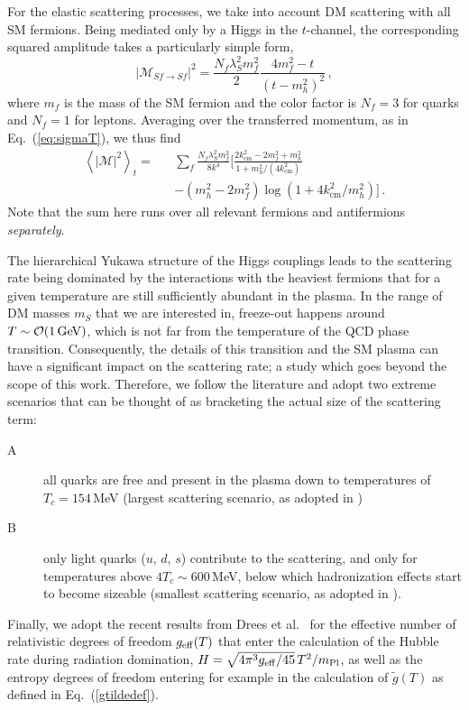 \documentclass[twocolumn,showpacs,amsmath,amssymb,superscriptaddress,nofootinbib]{revtex4-1}
\newcommand{\be}{\begin{equation}}
\newcommand{\ee}{\end{equation}}
\newcommand{\bea}{\begin{eqnarray}}
\newcommand{\eea}{\end{eqnarray}}
\begin{document}
For the elastic scattering processes, we take into account DM scattering with all SM fermions. Being mediated 
only by a Higgs in the $t$-channel, the corresponding squared amplitude takes a particularly simple form,
\be
\left| \mathcal{M}_{Sf\to Sf}\right|^2 = \frac{N_f\lambda_S^2m_f^2}{2}\frac{4m_f^2-t}{(t-m_h^2)^2} \,,
\ee
where $m_f$ is the mass of the SM fermion and the color factor is $N_f= 3$ for quarks and $N_f= 1$ 
for leptons.  Averaging over the transferred momentum, as in Eq.~(\ref{eq:sigmaT}), 
we thus find
\bea
\left\langle \left| \mathcal{M}\right|^2 \right\rangle_t=&&
\sum_f\frac{N_f\lambda_S^2m_f^2}{8k^4}\Big[
\frac{2k^2_\mathrm{cm}-2m_f^2+m_h^2}{1+m_h^2/(4k^2_\mathrm{cm})} \nonumber \\
&&-\left( m_h^2-2m_f^2\right) \log\left(1+4k^2_\mathrm{cm}/m_h^2 \right)
\Big]\,.
\label{eq:Mscatt}
\eea
Note that the sum here runs over all relevant fermions and antifermions {\it separately}.

The hierarchical Yukawa structure of the Higgs couplings leads to the scattering rate being 
dominated by the interactions with the heaviest fermions that for a given temperature are still 
sufficiently abundant in the plasma. In the range of DM masses $m_S$ that 
we are interested in, freeze-out happens around $T\sim \mathcal{O}(1\, \rm{GeV})$, which 
is not far from the temperature of the QCD phase transition. 
Consequently, the details of this transition and the SM plasma can have a significant impact 
on the scattering rate; a study which goes beyond the scope of this work. Therefore, we follow the
literature and adopt two extreme scenarios that can be thought of as bracketing the actual size of 
the scattering term:
\begin{description}
\item[A] all quarks are free and present in the plasma down to temperatures of $T_c = 154$\,MeV (largest scattering 
scenario, as adopted in \cite{Gondolo:2012vh})
\item[B] only light quarks ($u$, $d$, $s$) contribute to the scattering, and only for temperatures above 
$4T_c \sim 600$\,MeV, below which hadronization effects start to become sizeable \cite{Boyanovsky:2006bf} (smallest scattering scenario, as adopted in \cite{Bringmann:2009vf}).
\end{description}

Finally, we adopt the recent results from Drees et al.~\cite{Drees:2015exa} for the effective number of relativistic
degrees of freedom $g_{\rm eff}(T)$ that enter the calculation of the Hubble rate during radiation domination,
 $H=\sqrt{4\pi^3g_{\rm eff}/45}\,T^2/m_{\rm Pl}$, as well as the entropy degrees of freedom entering for example in the 
 calculation of $\tilde g(T)$ as defined in Eq.~(\ref{gtildedef}). 
\end{document}
